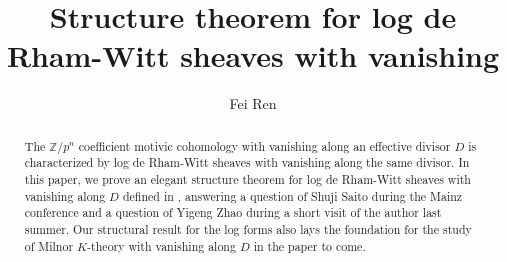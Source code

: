 \documentclass[11pt]{amsart}
\title{Structure theorem for log de Rham-Witt sheaves with vanishing}
\author{Fei Ren}
\newcommand{\Z}{\mathbb{Z}}
\theoremstyle{plain}
\theoremstyle{definition}
\numberwithin{equation}{prop}
\begin{document}
\begin{abstract}
The $\Z/p^n$ coefficient motivic cohomology with vanishing along an effective divisor $D$ is characterized by log de Rham-Witt sheaves with vanishing along the same divisor.
In this paper, we prove an elegant structure theorem for log de Rham-Witt sheaves with vanishing along $D$ defined in \cite{RamFil1}, answering a question of Shuji Saito during the Mainz conference and a question of Yigeng Zhao during a short visit of the author last summer.
Our structural result for the log forms also lays the foundation for the study of Milnor $K$-theory with vanishing along $D$ in the paper to come. 
\end{abstract}
\maketitle

\tableofcontents
\end{document}
